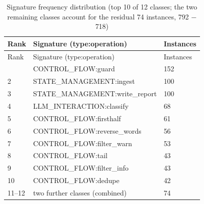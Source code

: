 \documentclass[
  11pt,
]{article}
\begin{document}
\begin{longtable}[]{@{}lll@{}}
\caption{Signature frequency distribution (top 10 of 12 classes; the two
remaining classes account for the residual 74 instances, 792 −
718)}\tabularnewline
\toprule\noalign{}
Rank & Signature (type:operation) & Instances \\
\midrule\noalign{}
\endfirsthead
\toprule\noalign{}
Rank & Signature (type:operation) & Instances \\
\midrule\noalign{}
\endhead
\bottomrule\noalign{}
\endlastfoot
1 & CONTROL\_FLOW:guard & 152 \\
2 & STATE\_MANAGEMENT:ingest & 100 \\
3 & STATE\_MANAGEMENT:write\_report & 100 \\
4 & LLM\_INTERACTION:classify & 68 \\
5 & CONTROL\_FLOW:firsthalf & 61 \\
6 & CONTROL\_FLOW:reverse\_words & 56 \\
7 & CONTROL\_FLOW:filter\_warn & 53 \\
8 & CONTROL\_FLOW:tail & 43 \\
9 & CONTROL\_FLOW:filter\_info & 43 \\
10 & CONTROL\_FLOW:dedupe & 42 \\
11--12 & two further classes (combined) & 74 \\
\end{longtable}
\end{document}
